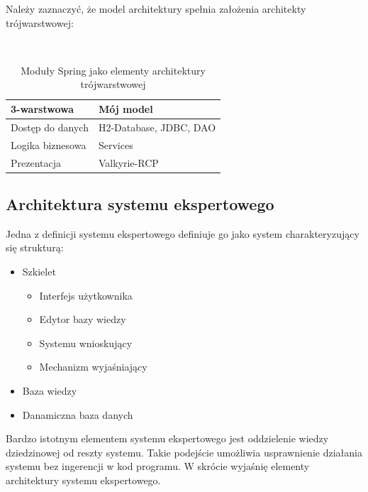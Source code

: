 Należy zaznaczyć, że model architektury spełnia założenia architekty trójwarstwowej:
\begin{table}[h]
 \caption{Moduły Spring jako elementy architektury trójwarstwowej}
 \small\tt
 \centering
 \vspace{0in}
 \begin{tabular}{|l|l|}
 \hline
 \textbf{3-warstwowa} & \textbf{Mój model} \\ 
 \hline
 Dostęp do danych & H2-Database, JDBC, DAO \\
 \hline
 Logika biznesowa & Services \\
 \hline
 Prezentacja & Valkyrie-RCP \\
 \hline
 \end{tabular}
\end{table}

\subsection{Architektura systemu ekspertowego}
\label{sec:architekturaSystemuEkspertowego}
Jedna z definicji systemu ekspertowego definiuje go jako system charakteryzujący się strukturą:
\begin{itemize}
 \item Szkielet
       \begin{itemize}
	 \item Interfejs użytkownika
	 \item Edytor bazy wiedzy
	 \item Systemu wnioskujący
	 \item Mechanizm wyjaśniający
       \end{itemize}
 \item Baza wiedzy
 \item Danamiczna baza danych
\end{itemize}

Bardzo istotnym elementem systemu ekspertowego jest oddzielenie wiedzy dziedzinowej od reszty systemu. Takie podejście umożliwia usprawnienie działania systemu bez ingerencji w kod programu. W skrócie wyjaśnię elementy architektury systemu ekspertowego.


